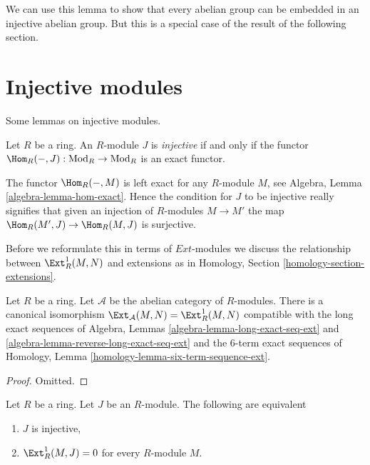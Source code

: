 \noindent
We can use this lemma to show that every abelian
group can be embedded in an injective abelian
group. But this is a special case of the result of
the following section.





\section{Injective modules}
\label{section-injectives-modules}

\noindent
Some lemmas on injective modules.

\begin{definition}
\label{definition-projective}
Let $R$ be a ring. An $R$-module $J$ is {\it injective} if and only if
the functor $\Hom_R(-, J) : \text{Mod}_R \to \text{Mod}_R$ is
an exact functor.
\end{definition}

\noindent
The functor $\Hom_R(- , M)$ is left exact for any $R$-module $M$, see
Algebra, Lemma \ref{algebra-lemma-hom-exact}.
Hence the condition for $J$ to be injective really signifies that given
an injection of $R$-modules $M \to M'$ the map
$\Hom_R(M', J) \to \Hom_R(M, J)$ is surjective.

\medskip\noindent
Before we reformulate this in terms of ${Ext}$-modules we discuss the
relationship between $\Ext^1_R(M, N)$ and extensions as in
Homology, Section \ref{homology-section-extensions}.

\begin{lemma}
\label{lemma-relation-ext-ext}
Let $R$ be a ring. Let $\mathcal{A}$ be the abelian category of
$R$-modules. There is a canonical isomorphism
$\Ext_\mathcal{A}(M, N) = \Ext^1_R(M, N)$
compatible with the long exact sequences of
Algebra, Lemmas \ref{algebra-lemma-long-exact-seq-ext} and
\ref{algebra-lemma-reverse-long-exact-seq-ext}
and the $6$-term exact sequences of
Homology, Lemma \ref{homology-lemma-six-term-sequence-ext}.
\end{lemma}

\begin{proof}
Omitted.
\end{proof}

\begin{lemma}
\label{lemma-characterize-injective}
Let $R$ be a ring. Let $J$ be an $R$-module.
The following are equivalent
\begin{enumerate}
\item $J$ is injective,
\item $\Ext^1_R(M, J) = 0$ for every $R$-module $M$.
\end{enumerate}
\end{lemma}

